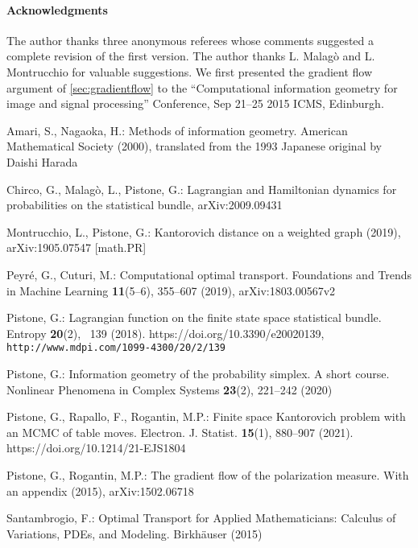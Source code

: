 \documentclass[runningheads]{llncs}
\begin{document}
\paragraph{Acknowledgments}
The author thanks three anonymous referees whose comments suggested a complete revision of the first version. The author thanks L. Malag\`o and L. Montrucchio for valuable suggestions. We first presented the gradient flow argument of \cref{sec:gradientflow} to the ``Computational information geometry for image and signal processing'' Conference, Sep 21--25 2015 ICMS, Edinburgh.


%
%

\begin{thebibliography}{1}
\providecommand{\url}[1]{\texttt{#1}}
\providecommand{\urlprefix}{URL }
\providecommand{\doi}[1]{https://doi.org/#1}

Amari, S., Nagaoka, H.: Methods of information geometry. American Mathematical
  Society (2000), translated from the 1993 Japanese original by Daishi Harada

Chirco, G., Malag\`o, L., Pistone, G.: Lagrangian and {H}amiltonian dynamics
  for probabilities on the statistical bundle, arXiv:2009.09431

Montrucchio, L., Pistone, G.: Kantorovich distance on a weighted graph (2019),
  arXiv:1905.07547 [math.PR]

Peyr\'e, G., Cuturi, M.: Computational optimal transport. Foundations and
  Trends in Machine Learning  \textbf{11}(5--6),  355--607 (2019),
  arXiv:1803.00567v2

Pistone, G.: Lagrangian function on the finite state space statistical bundle.
  Entropy  \textbf{20}(2), ~139 (2018). \doi{10.3390/e20020139},
  \url{http://www.mdpi.com/1099-4300/20/2/139}

Pistone, G.: Information geometry of the probability simplex. {A} short course.
  Nonlinear Phenomena in Complex Systems  \textbf{23}(2),  221--242 (2020)

Pistone, G., Rapallo, F., Rogantin, M.P.: Finite space {K}antorovich problem
  with an {MCMC} of table moves. Electron. J. Statist.  \textbf{15}(1),
  880--907 (2021). \doi{10.1214/21-EJS1804}

Pistone, G., Rogantin, M.P.: The gradient flow of the polarization measure.
  {W}ith an appendix (2015), arXiv:1502.06718

Santambrogio, F.: Optimal {T}ransport for {A}pplied {M}athematicians:
  {C}alculus of {V}ariations, {PDE}s, and {M}odeling. Birkh\"auser (2015)

\end{thebibliography}
\end{document}
